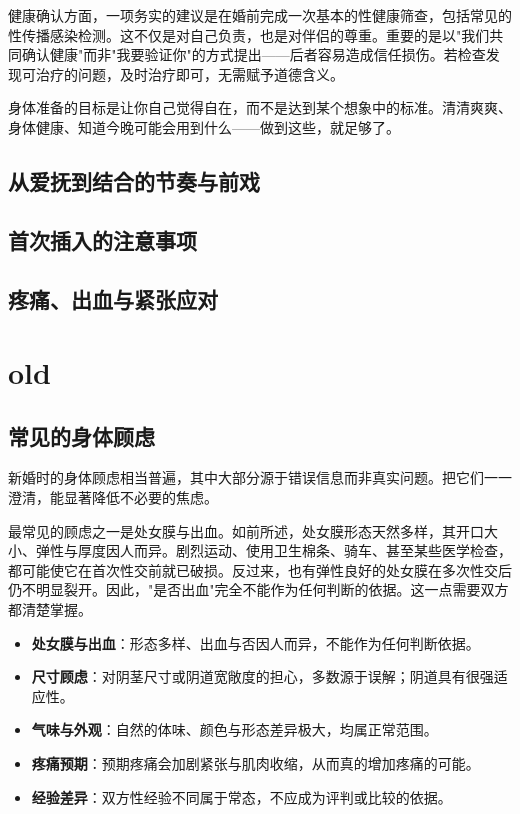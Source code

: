 \documentclass[12pt,UTF8]{ctexbook}
\newcommand{\keyword}[1]{\textbf{#1}}
\begin{document}
健康确认方面，一项务实的建议是在婚前完成一次基本的性健康筛查，包括常见的性传播感染检测。这不仅是对自己负责，也是对伴侣的尊重。重要的是以"我们共同确认健康"而非"我要验证你"的方式提出——后者容易造成信任损伤。若检查发现可治疗的问题，及时治疗即可，无需赋予道德含义。

\begin{tcolorbox}[colback=pink!5!white,colframe=red!50!black,title=贴心小叮咛]
	身体准备的目标是让你自己觉得自在，而不是达到某个想象中的标准。清清爽爽、身体健康、知道今晚可能会用到什么——做到这些，就足够了。
\end{tcolorbox}

\subsection{从爱抚到结合的节奏与前戏}

\subsection{首次插入的注意事项}

\subsection{疼痛、出血与紧张应对}

\section{old}

\subsection{常见的身体顾虑}

新婚时的身体顾虑相当普遍，其中大部分源于错误信息而非真实问题。把它们一一澄清，能显著降低不必要的焦虑。

最常见的顾虑之一是处女膜与出血。如前所述，处女膜形态天然多样，其开口大小、弹性与厚度因人而异。剧烈运动、使用卫生棉条、骑车、甚至某些医学检查，都可能使它在首次性交前就已破损。反过来，也有弹性良好的处女膜在多次性交后仍不明显裂开。因此，"是否出血"完全不能作为任何判断的依据。这一点需要双方都清楚掌握。

\begin{itemize}
	\item \keyword{处女膜与出血}：形态多样、出血与否因人而异，不能作为任何判断依据。
	\item \keyword{尺寸顾虑}：对阴茎尺寸或阴道宽敞度的担心，多数源于误解；阴道具有很强适应性。
	\item \keyword{气味与外观}：自然的体味、颜色与形态差异极大，均属正常范围。
	\item \keyword{疼痛预期}：预期疼痛会加剧紧张与肌肉收缩，从而真的增加疼痛的可能。
	\item \keyword{经验差异}：双方性经验不同属于常态，不应成为评判或比较的依据。
\end{itemize}
\end{document}
